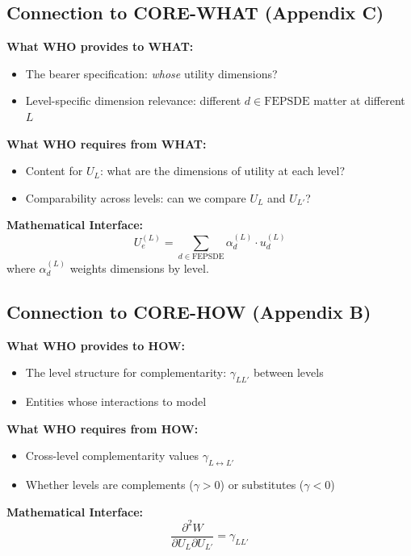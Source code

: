 \subsection{Connection to CORE-WHAT (Appendix C)}

\begin{tcolorbox}[colback=yellow!5!white, colframe=yellow!75!black,
    title=Integration: CORE-WHO $\leftrightarrow$ CORE-WHAT]
\textbf{What WHO provides to WHAT:}
\begin{itemize}[nosep]
\item The bearer specification: \textit{whose} utility dimensions?
\item Level-specific dimension relevance: different $d \in \text{FEPSDE}$ matter at different $L$
\end{itemize}

\textbf{What WHO requires from WHAT:}
\begin{itemize}[nosep]
\item Content for $U_L$: what are the dimensions of utility at each level?
\item Comparability across levels: can we compare $U_L$ and $U_{L'}$?
\end{itemize}

\textbf{Mathematical Interface:}
\begin{equation}
U_e^{(L)} = \sum_{d \in \text{FEPSDE}} \alpha_d^{(L)} \cdot u_d^{(L)}
\end{equation}
where $\alpha_d^{(L)}$ weights dimensions by level.
\end{tcolorbox}

\subsection{Connection to CORE-HOW (Appendix B)}

\begin{tcolorbox}[colback=yellow!5!white, colframe=yellow!75!black,
    title=Integration: CORE-WHO $\leftrightarrow$ CORE-HOW]
\textbf{What WHO provides to HOW:}
\begin{itemize}[nosep]
\item The level structure for complementarity: $\gamma_{LL'}$ between levels
\item Entities whose interactions to model
\end{itemize}

\textbf{What WHO requires from HOW:}
\begin{itemize}[nosep]
\item Cross-level complementarity values $\gamma_{L \leftrightarrow L'}$
\item Whether levels are complements ($\gamma > 0$) or substitutes ($\gamma < 0$)
\end{itemize}

\textbf{Mathematical Interface:}
\begin{equation}
\frac{\partial^2 W}{\partial U_L \partial U_{L'}} = \gamma_{LL'}
\end{equation}
\end{tcolorbox}

